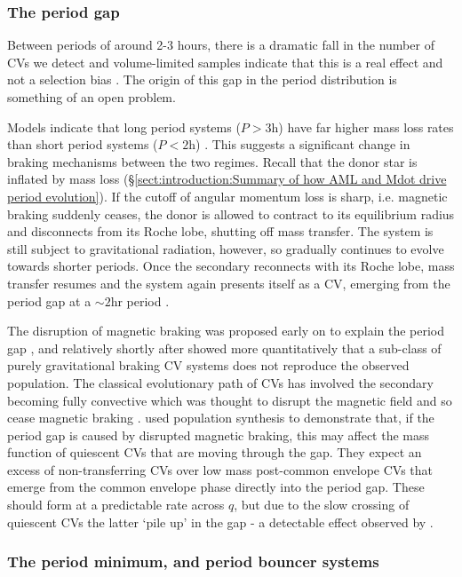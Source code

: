 \subsubsection{The period gap}
\label{sect:introduction:period gap}

Between periods of around 2-3 hours, there is a dramatic fall in the number of CVs we detect and volume-limited samples indicate that this is a real effect and not a selection bias \citep{Kolb1998,pala2020}. The origin of this gap in the period distribution is something of an open problem.

Models indicate that long period systems ($P > 3$h) have far higher mass loss rates than short period systems ($P < 2$h) \citep{ritter1985}. This suggests a significant change in braking mechanisms between the two regimes.
Recall that the donor star is inflated by mass loss (\S\ref{sect:introduction:Summary of how AML and Mdot drive period evolution}).
If the cutoff of angular momentum loss is sharp, i.e. magnetic braking suddenly ceases, the donor is allowed to contract to its equilibrium radius and disconnects from its Roche lobe, shutting off mass transfer.
The system is still subject to gravitational radiation, however, so gradually continues to evolve towards shorter periods. Once the secondary reconnects with its Roche lobe, mass transfer resumes and the system again presents itself as a CV, emerging from the period gap at a $\sim2$hr period \citep{kolb2002}.

The disruption of magnetic braking was proposed early on to explain the period gap \citep{rappaport1983, spruit1983}, and relatively shortly after \citet{kolb1993} showed more quantitatively that a sub-class of purely gravitational braking CV systems does not reproduce the observed population.
The classical evolutionary path of CVs has involved the secondary becoming fully convective which was thought to disrupt the magnetic field and so cease magnetic braking \citep{knigge11}.
\citet{Davis2008} used population synthesis to demonstrate that, if the period gap is caused by disrupted magnetic braking, this may affect the mass function of quiescent CVs that are moving through the gap. They expect an excess of non-transferring CVs over low mass post-common envelope CVs that emerge from the common envelope phase directly into the period gap.
These should form at a predictable rate across $q$, but due to the slow crossing of quiescent CVs the latter `pile up' in the gap - a detectable effect observed by \citet{zorotovic2011}.


\subsubsection{The period minimum, and period bouncer systems}
\label{sect:introduction:period minimum and bouncers}

